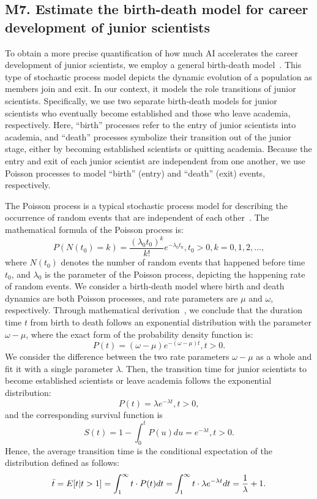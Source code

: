 \subsection*{M7. Estimate the birth-death model for career development of junior scientists}
To obtain a more precise quantification of how much AI accelerates the career development of junior scientists, we employ a general birth-death model~\supercite{kendall1960birth}.
This type of stochastic process model depicts the dynamic evolution of a population as members join and exit.
In our context, it models the role transitions of junior scientists.
Specifically, we use two separate birth-death models for junior scientists who eventually become established and those who leave academia, respectively.
Here, “birth” processes refer to the entry of junior scientists into academia, and “death” processes symbolize their transition out of the junior stage, either by becoming established scientists or quitting academia.
Because the entry and exit of each junior scientist are independent from one another, we use Poisson processes to model “birth” (entry) and “death” (exit) events, respectively.

The Poisson process is a typical stochastic process model for describing the occurrence of random events that are independent of each other~\supercite{kingman1992poisson}.
The mathematical formula of the Poisson process is:
\begin{equation}
    P(N(t_0)=k)=\frac{(\lambda_0 t_0)^k}{k!}e^{-\lambda_0 t_0}, t_0>0, k=0, 1, 2, \dots,
\end{equation}
where $N(t_0)$ denotes the number of random events that happened before time $t_0$, and $\lambda_0$ is the parameter of the Poisson process, depicting the happening rate of random events.
We consider a birth-death model where birth and death dynamics are both Poisson processes, and rate parameters are $\mu$ and $\omega$, respectively.
Through mathematical derivation~\supercite{meisling1958discrete}, we conclude that the duration time $t$ from birth to death follows an exponential distribution with the parameter $\omega-\mu$, where the exact form of the probability density function is:
\begin{equation}
    P(t)=(\omega-\mu)e^{-(\omega-\mu)t}, t>0.
\end{equation}
We consider the difference between the two rate parameters $\omega-\mu$ as a whole and fit it with a single parameter $\lambda$.
Then, the transition time for junior scientists to become established scientists or leave academia follows the exponential distribution:
\begin{equation}
    P(t)=\lambda e^{-\lambda t}, t>0,
\end{equation}
and the corresponding survival function is
\begin{equation}
    S(t)=1-\int_0^t P(u)du=e^{-\lambda t}, t>0.
\end{equation}
Hence, the average transition time is the conditional expectation of the distribution defined as follows:
\begin{equation}
    \Bar{t}=E[t|t>1]=\int_1^{\infty}t\cdot P(t)dt=\int_1^{\infty}t\cdot\lambda e^{-\lambda t}dt=\frac{1}{\lambda}+1.
\end{equation}

